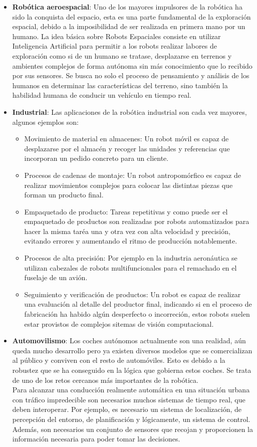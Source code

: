 \begin{itemize}
\item \textbf{Robótica aeroespacial}: Uno de los mayores impulsores de la robótica ha sido la conquista del espacio, esta es una parte fundamental de la exploración espacial, debido a la imposibilidad de ser realizada en primera mano por un humano.
La idea básica sobre Robots Espaciales consiste en utilizar Inteligencia Artificial para
permitir a los robots realizar labores de exploración como si de un humano se tratase, desplazarse en terrenos y ambientes complejos de forma autónoma sin más conocimiento que lo recibido por sus sensores. Se busca no solo el proceso de pensamiento y análisis de los humanos en determinar las características del terreno, sino también la habilidad humana de conducir un vehículo en tiempo real.
\item \textbf{Industrial}: Las aplicaciones de la robótica industrial son cada vez mayores, algunos ejemplos son:
\begin{itemize}
\item Movimiento de material en almacenes: Un robot móvil es capaz de desplazarse por el almacén y recoger las unidades y referencias que incorporan un pedido concreto para un cliente.
\item Procesos de cadenas de montaje: Un robot antropomórfico es capaz de realizar movimientos complejos para colocar las distintas piezas que forman un producto final.
\item Empaquetado de producto: Tareas repetitivas y como puede ser el empaquetado de productos son realizadas por robots automatizados para hacer la misma taréa una y otra vez con alta velocidad y precisión, evitando errores y aumentando el ritmo de producción notablemente.
\item Procesos de alta precisión: Por ejemplo en la industria aeronáutica se utilizan cabezales de robots multifuncionales para el remachado en el fuselaje de un avión.
\item Seguimiento y verificación de productos: Un robot es capaz de realizar una evaluación al detalle del productor final, indicando si en el proceso de fabricación ha habido algún desperfecto o incorreción, estos robots suelen estar provistos de complejos sitemas de visión computacional.
\end{itemize}

\item \textbf{Automovilismo}: Los coches autónomos actualmente son una realidad, aún queda mucho desarrollo pero ya existen diversos modelos que se comercializan al público y conviven con el resto de automóviles. Esto es debido a la robustez que se ha conseguido en la lógica que gobierna estos coches. Se trata de uno de los retos cercanos más importantes de la robótica.\\
Para alcanzar una conducción realmente automática en una situación urbana con tráfico impredecible son necesarios muchos sistemas de tiempo real, que deben interoperar. Por ejemplo, es necesario un sistema de localización, de percepción del entorno, de planificación y lógicamente, un sistema de control. Además, son necesarios un conjunto de sensores que recojan y proporcionen la información necesaria para poder tomar las decisiones.


\end{itemize}

